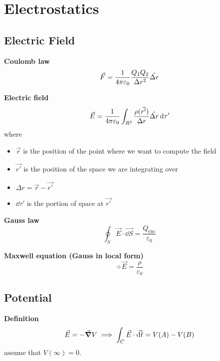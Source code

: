 \documentclass[10pt]{extarticle}
\numberwithin{equation}{section}
\begin{document}
\section{Electrostatics}
\begin{multicols}{2}
    \subsection{Electric Field}

    \textbf{Coulomb law}
    \begin{equation}
        \vec F = \frac{1}{4\pi \varepsilon_0} \frac{Q_1 Q_2}{\Delta r^2} \hat{\Delta r}
    \end{equation}

    \textbf{Electric field}
    \begin{equation}
        \vec E =
        \frac{1}{4 \pi \varepsilon_0}
        \int_{R^3} \frac{\rho (\vec{r'})}{\Delta r} \hat{\Delta r} \dd{\tau'}
    \end{equation}
    where
    \begin{itemize}
        \item $\vec r$ is the position of the point where we want to compute the field
        \item $\vec{r'}$ is the position of the space we are integrating over
        \item $\Delta r = \vec r - \vec{r'}$
        \item $\dd \tau'$ is the portion of space at $\vec{r'}$
    \end{itemize}

    \textbf{Gauss law}
    \begin{equation}
        \oint_S \vec E \cdot \vec{\dd S} = \frac{Q_\text{enc}}{\varepsilon_0}
    \end{equation}

    \textbf{Maxwell equation (Gauss in local form)}
    \begin{equation}
        \div \vec E = \frac{\rho}{\varepsilon_0}
    \end{equation}

    \subsection{Potential}

    \textbf{Definition}
    \begin{equation}
        \vec E = - \grad V \implies \int_C \vec E \cdot \vec{\dd \ell} = V(A) - V(B)
    \end{equation}
    assume that $V(\infty) = 0$.


\end{multicols}
\end{document}
